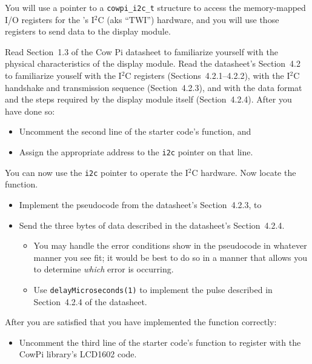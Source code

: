 You will use a pointer to a \lstinline{cowpi_i2c_t} structure to access the memory-mapped I/O registers for the \developmentboard's I$^2$C (aks ``TWI'') hardware,
and you will use those registers to send data to the display module.

Read Section~1.3 of the Cow Pi datasheet to familiarize yourself with the physical characteristics of the display module.
Read the datasheet's Section~4.2 to familiarize youself with the I$^2$C registers (Sections~4.2.1--4.2.2), with the I$^2$C handshake and transmission sequence (Section~4.2.3), and with the data format and the steps required by the display module itself (Section~4.2.4). After you have done so:

\begin{itemize}
    \item Uncomment the second line of the starter code's  function, and
    \item Assign the appropriate address to the \lstinline{i2c} pointer on that line.
\end{itemize}

You can now use the \lstinline{i2c} pointer to operate the I$^2$C hardware.
Now locate the  function.

\begin{itemize}
    \item Implement the pseudocode from the datasheet's Section~4.2.3, to
    \item Send the three bytes of data described in the datasheet's Section~4.2.4.
        \begin{itemize}
            \item You may handle the error conditions show in the pseudocode in whatever manner you see fit; it would be best to do so in a manner that allows you to determine \textit{which} error is occurring.
            \item Use \lstinline{delayMicroseconds(1)} to implement the pulse described in Section~4.2.4 of the datasheet.
        \end{itemize}
\end{itemize}

After you are satisfied that you have implemented the  function correctly:

\begin{itemize}
    \item Uncomment the third line of the starter code's  function to register  with the CowPi library's LCD1602 code.
\end{itemize}


